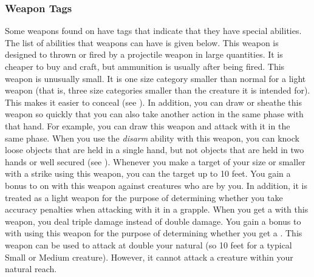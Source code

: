        \subsubsection{Weapon Tags}\label{Weapon Tags}
            Some weapons found on  have tags that indicate that they have special abilities. The list of abilities that weapons can have is given below.
             This weapon is designed to thrown or fired by a projectile weapon in large quantities. It is cheaper to buy and craft, but ammunition is usually  after being fired.
             This weapon is unusually small.
            It is one size category smaller than normal for a light weapon (that is, three size categories smaller than the creature it is intended for).
            This makes it easier to conceal (see ).
            In addition, you can draw or sheathe this weapon so quickly that you can also take another action in the same phase with that hand.
            For example, you can draw this weapon and attack with it in the same phase.
             When you use the \textit{disarm} ability with this weapon, you can knock loose objects that are held in a single hand, but not objects that are held in two hands or well secured (see ).
             Whenever you make a target of your size or smaller  with a strike using this weapon, you can  the target up to 10 feet.
             You gain a  bonus to  on  with this weapon against creatures who are  by you.
            In addition, it is treated as a light weapon for the purpose of determining whether you take accuracy penalties when attacking with it in a grapple.
             When you get a  with this weapon, you deal triple damage instead of double damage.
             You gain a  bonus to  with  using this weapon for the purpose of determining whether you get a .
            \label{Long Weapon} This weapon can be used to attack at double your natural  (so 10 feet for a typical Small or Medium creature).
            However, it cannot attack a creature within your natural reach.

